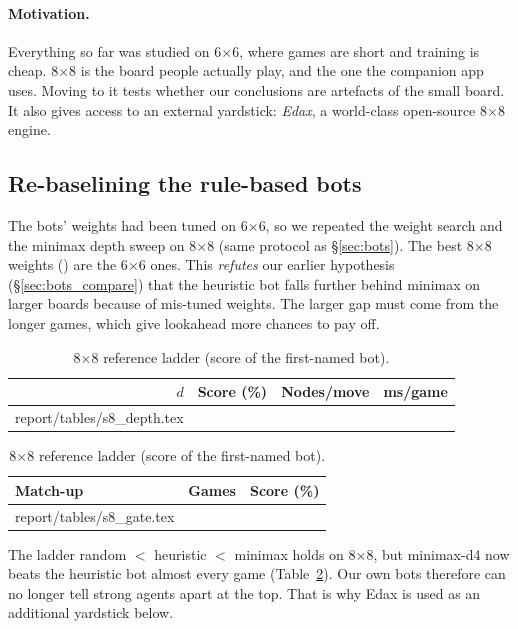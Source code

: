 \documentclass[11pt]{article}
\makeatletter
\newcommand{\bx}[1]{#1$\times$#1}
\newcommand{\tabinput}[1]{\@@input #1 }
\makeatother
\begin{document}
\paragraph{Motivation.} Everything so far was studied on \bx{6}, where games are
short and training is cheap. \bx{8} is the board people actually play, and the
one the companion app uses. Moving to it tests whether our conclusions are
artefacts of the small board. It also gives access to an external yardstick:
\emph{Edax}, a world-class open-source \bx{8} engine.

\subsection{Re-baselining the rule-based bots}
The bots' weights had been tuned on \bx{6}, so we repeated the weight search and
the minimax depth sweep on \bx{8} (same protocol as \S\ref{sec:bots}). The best
\bx{8} weights (\EightWeights) are \EightSameWeights{} the \bx{6} ones. This
\emph{refutes} our earlier hypothesis (\S\ref{sec:bots_compare}) that the
heuristic bot falls further behind minimax on larger boards because of
mis-tuned weights. The larger gap must come from the longer games, which give
lookahead more chances to pay off.

\begin{table}[H]
\centering
\begin{minipage}[t]{0.52\linewidth}\centering
\caption{\bx{8} minimax depth sweep against the heuristic bot.}
\label{tab:s8_depth}
\small
\begin{tabular}{@{}rlrr@{}}
\toprule
$d$ & Score (\%) & Nodes/move & ms/game \\
\midrule
\tabinput{report/tables/s8_depth.tex}
\bottomrule
\end{tabular}
\end{minipage}\hfill
\begin{minipage}[t]{0.45\linewidth}\centering
\caption{\bx{8} reference ladder (score of the first-named bot).}
\label{tab:s8_gate}
\small
\begin{tabular}{@{}lrl@{}}
\toprule
Match-up & Games & Score (\%) \\
\midrule
\tabinput{report/tables/s8_gate.tex}
\bottomrule
\end{tabular}
\end{minipage}
\end{table}

\noindent The ladder random $<$ heuristic $<$ minimax holds on \bx{8}, but
minimax-d4 now beats the heuristic bot almost every game
(Table~\ref{tab:s8_gate}). Our own bots therefore can no longer tell strong
agents apart at the top. That is why Edax is used as an additional yardstick
below.
\end{document}
